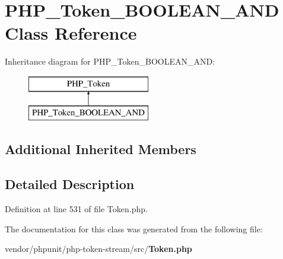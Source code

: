 \section{P\+H\+P\+\_\+\+Token\+\_\+\+B\+O\+O\+L\+E\+A\+N\+\_\+\+A\+N\+D Class Reference}
\label{class_p_h_p___token___b_o_o_l_e_a_n___a_n_d}
Inheritance diagram for P\+H\+P\+\_\+\+Token\+\_\+\+B\+O\+O\+L\+E\+A\+N\+\_\+\+A\+N\+D\+:\begin{figure}[H]
\begin{center}
\leavevmode
\includegraphics[height=2.000000cm]{class_p_h_p___token___b_o_o_l_e_a_n___a_n_d}
\end{center}
\end{figure}
\subsection*{Additional Inherited Members}


\subsection{Detailed Description}


Definition at line 531 of file Token.\+php.



The documentation for this class was generated from the following file\+:\begin{DoxyCompactItemize}
\item 
vendor/phpunit/php-\/token-\/stream/src/{\bf Token.\+php}\end{DoxyCompactItemize}
